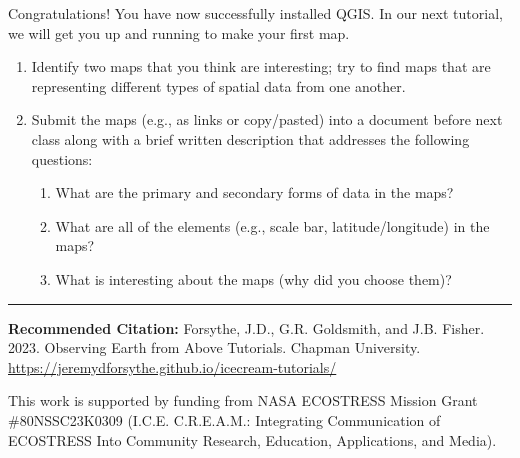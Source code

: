 \documentclass[oneside,a4paper,11pt,explicit]{book}
\begin{document}
Congratulations! You have now successfully installed QGIS. In our next tutorial, we will get you up and running to make your first map.

\begin{tcolorbox}[colback=yellow!5!white,colframe=IceCreamOrbit,title= \vspace{.2em} \Large Map of the Week Assignments]
	\large
	\begin{enumerate}
		\item Identify two maps that you think are interesting; try to find maps that are representing different types of spatial data from one another. 
        \item Submit the maps (e.g., as links or copy/pasted) into a document before next class along with a brief written description that addresses the following questions: 
        \begin{enumerate}
            \item What are the primary and secondary forms of data in the maps? 
            \item What are all of the elements (e.g., scale bar, latitude/longitude) in the maps? 
            \item What is interesting about the maps (why did you choose them)? 
        \end{enumerate}
    \end{enumerate}
\end{tcolorbox}


\hrule

\vspace{1em}

\small \textbf{Recommended Citation:} Forsythe, J.D., G.R. Goldsmith, and J.B. Fisher. 2023. Observing Earth from Above Tutorials. Chapman University. \url{https://jeremydforsythe.github.io/icecream-tutorials/}

\vspace{1em}

This work is supported by funding from NASA ECOSTRESS Mission Grant \#80NSSC23K0309 (I.C.E. C.R.E.A.M.: Integrating Communication of ECOSTRESS Into Community Research, Education, Applications, and Media).
\end{document}
